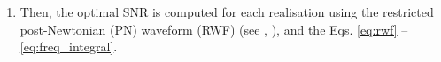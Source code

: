 \begin{enumerate}
        \item Then, the optimal SNR is computed for each realisation using the
            restricted post-Newtonian (PN) waveform (RWF) (see \cite{cutler_1994},
            \cite{kastha_2020}), and the Eqs. \ref{eq:rwf} -- \ref{eq:freq_integral}.

\end{enumerate}
